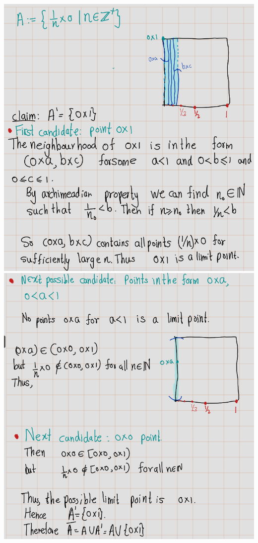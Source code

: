 \documentclass[
]{book}
\theoremstyle{definition}
\theoremstyle{definition}
\theoremstyle{definition}
\theoremstyle{definition}
\theoremstyle{remark}
\begin{document}
\includegraphics{figures/Exercises/Ex 2.17/ex-18-1.png}
\includegraphics{figures/Exercises/Ex 2.17/ex-18-2.png}
\end{document}
